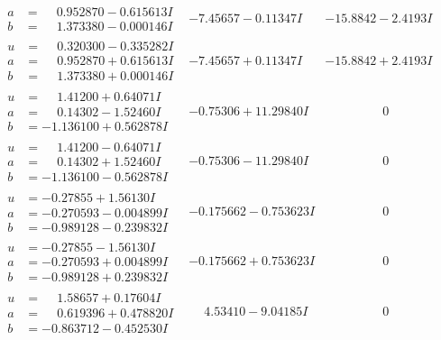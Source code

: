 \documentclass[1p]{elsarticle_modified}
\theoremstyle{definition}
\begin{document}
$$\begin{array}{c|c|c}
\begin{aligned}
a &= \phantom{-}0.952870 - 0.615613 I \\
b &= \phantom{-}1.373380 - 0.000146 I\end{aligned}
 & -7.45657 - 0.11347 I & -15.8842 - 2.4193 I \\ \hline\begin{aligned}
u &= \phantom{-}0.320300 - 0.335282 I \\
a &= \phantom{-}0.952870 + 0.615613 I \\
b &= \phantom{-}1.373380 + 0.000146 I\end{aligned}
 & -7.45657 + 0.11347 I & -15.8842 + 2.4193 I \\ \hline\begin{aligned}
u &= \phantom{-}1.41200 + 0.64071 I \\
a &= \phantom{-}0.14302 - 1.52460 I \\
b &= -1.136100 + 0.562878 I\end{aligned}
 & -0.75306 + 11.29840 I & \phantom{-0.000000 } 0 \\ \hline\begin{aligned}
u &= \phantom{-}1.41200 - 0.64071 I \\
a &= \phantom{-}0.14302 + 1.52460 I \\
b &= -1.136100 - 0.562878 I\end{aligned}
 & -0.75306 - 11.29840 I & \phantom{-0.000000 } 0 \\ \hline\begin{aligned}
u &= -0.27855 + 1.56130 I \\
a &= -0.270593 - 0.004899 I \\
b &= -0.989128 - 0.239832 I\end{aligned}
 & -0.175662 - 0.753623 I & \phantom{-0.000000 } 0 \\ \hline\begin{aligned}
u &= -0.27855 - 1.56130 I \\
a &= -0.270593 + 0.004899 I \\
b &= -0.989128 + 0.239832 I\end{aligned}
 & -0.175662 + 0.753623 I & \phantom{-0.000000 } 0 \\ \hline\begin{aligned}
u &= \phantom{-}1.58657 + 0.17604 I \\
a &= \phantom{-}0.619396 + 0.478820 I \\
b &= -0.863712 - 0.452530 I\end{aligned}
 & \phantom{-}4.53410 - 9.04185 I & \phantom{-0.000000 } 0\\

\end{array}$$
\end{document}
